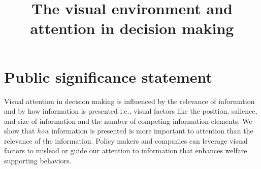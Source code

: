 \documentclass[english,natbib,man,floatsintext]{apa6}
\title{The visual environment and attention in decision making}
\begin{document}

%

\linenumbers
\maketitle

\section{\normalfont\normalsize Public significance statement}
\noindent Visual attention in decision making is influenced by the relevance of information and by how information is presented i.e., visual factors like the position, salience, and size of information and the number of competing information elements. We show that \textit{how} information is presented is more important to attention than the relevance of the information. Policy makers and companies can leverage visual factors to mislead or guide our attention to information that enhances welfare supporting behaviors.\par
\newpage













\clearpage



\appendix

\end{document}
